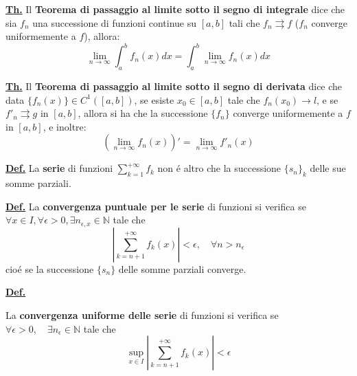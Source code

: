\documentclass[a4paper,10pt]{article} %
\renewcommand{\b}[1]{%
    {\textbf{#1}}}
\newcommand{\ldef}[1]{%
    {\smallbreak\par\tiny\textbf{\underline{Def.}} {#1} \smallbreak}}
\newcommand{\ltheorem}[1]{%
    {\smallbreak\par\tiny\textbf{\underline{Th.}} {#1} \smallbreak\par}}
\newcommand{\ldim}[1]{%
    {\smallbreak\par\tiny\emph{\textbf{Dimostrazione}} {#1} \par}}
\renewcommand{\ldim}[1]{{}}
\begin{document}
\begin{multicols}{6}
\ltheorem{
    Il \b{Teorema di passaggio al limite sotto il segno di integrale} dice che
    sia ${f_n}$ una successione di funzioni continue su $[a,b]$ tali che $f_n \rightrightarrows f$ ($f_n$ converge uniformemente a $f$), allora:
    $$
        \lim_{n \rightarrow \infty} \int_a^b f_n(x)dx = \int_a^b \lim_{n \rightarrow \infty} f_n(x)dx 
    $$
    \ldim{
        Bisogna dimostrare che $ \forall \epsilon > 0, \quad \exists n_\epsilon$ tale che::
        $$
            \left| \int_a^b f_n(x)dx - \int_a^b f(x)dx \right| < \epsilon , \quad
            \forall n \geq n_\epsilon 
        $$
        Siccome le $f_n$ sono continue, sono tutte integrabili. Inoltre, siccomeme $f_n \rightrightarrows f$, per il teorema di continuit\'{a} del limite, $f$ \`{e} continua e quindi integrabile
        \begin{gather*}
            \left| \int_a^b f_n(x)dx - \int_a^b f(x)dx \right| \leq \int_a^b \left| f_n(x) - f(x) \right| dx \\
            \leq \int_a^b \sup_{x\in [a,b]} \mid f_n(x) - f(x) \mid dx \\
            \leq  \; \mid b - a \mid \sup_{x\in [a,b]} \mid f_n(x) - f(x) \mid 
            \quad \rightarrow 0
        \end{gather*}
    }
}

\ltheorem{
    Il \b{Teorema di passaggio al limite sotto il segno di derivata} dice che data
    $\{f_n(x)\} \in C^1([a,b])$, se esiste $x_0 \in [a,b]$ tale che $f_n(x_0)
    \rightarrow l$, e se $f'_n \rightrightarrows g$ in $[a,b]$, allora si ha che
    la successione $\{f_n\}$ converge uniformemente a $f$ in $[a,b]$, e inoltre:
    \[
        \left( \lim_{n \rightarrow \infty} f_n(x) \right) ' = 
        \lim_{n \rightarrow \infty} f'_n(x)
    \]
    \ldim{
        Manca!
    }
}


\ldef{
    La \b{serie} di funzioni $\displaystyle \sum_{k=1}^{+\infty} f_k$ non \'{e} altro che la successione $\{s_n\}_k$ delle sue somme parziali.
}

\ldef{
    La \b{convergenza puntuale per le serie} di funzioni si verifica se
    $\forall x \in I, \forall \epsilon > 0, \exists n_{\epsilon, x} \in
    \mathbb{N}$ tale che 
    \[ 
        \left| \sum_{k=n+1}^{+\infty} f_k(x) \right| < \epsilon, \quad
        \forall n > n_\epsilon 
    \]
    cio\'e se la successione $\{s_n\}$ delle somme parziali converge.
}

\ldef{
    La \b{convergenza uniforme delle serie} di funzioni si verifica se 
    $ \forall \epsilon > 0, \quad \exists n_\epsilon \in \mathbb{N}$ tale che
    $$ \sup_{x\in I} \left| \sum_{k=n+1}^{+\infty} f_k(x) \right| < \epsilon $$

}
\end{multicols}
\end{document}
